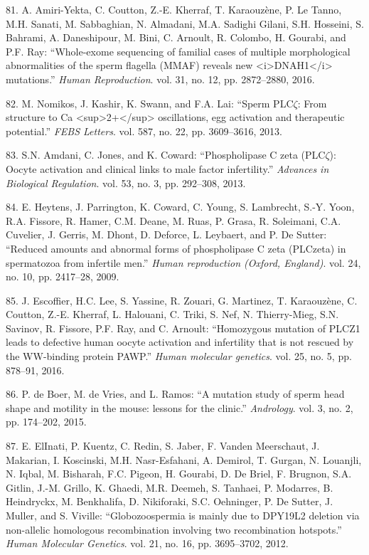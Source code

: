 \documentclass[12pt,twoside]{ugathesis}
\theoremstyle{definition}
\theoremstyle{definition}
\theoremstyle{remark}
\begin{document}
\hypertarget{ref-Amiri-Yekta2016}{}
81. A. Amiri-Yekta, C. Coutton, Z.-E. Kherraf, T. Karaouzène, P. Le
Tanno, M.H. Sanati, M. Sabbaghian, N. Almadani, M.A. Sadighi Gilani,
S.H. Hosseini, S. Bahrami, A. Daneshipour, M. Bini, C. Arnoult, R.
Colombo, H. Gourabi, and P.F. Ray: ``Whole-exome sequencing of familial
cases of multiple morphological abnormalities of the sperm flagella
(MMAF) reveals new
\textless{}i\textgreater{}DNAH1\textless{}/i\textgreater{} mutations.''
\emph{Human Reproduction}. vol. 31, no. 12, pp. 2872--2880, 2016.

\hypertarget{ref-Nomikos2013}{}
82. M. Nomikos, J. Kashir, K. Swann, and F.A. Lai: ``Sperm PLC\(\zeta\):
From structure to Ca
\textless{}sup\textgreater{}2+\textless{}/sup\textgreater{}
oscillations, egg activation and therapeutic potential.'' \emph{FEBS
Letters}. vol. 587, no. 22, pp. 3609--3616, 2013.

\hypertarget{ref-Amdani2013}{}
83. S.N. Amdani, C. Jones, and K. Coward: ``Phospholipase C zeta
(PLC\(\zeta\)): Oocyte activation and clinical links to male factor
infertility.'' \emph{Advances in Biological Regulation}. vol. 53, no. 3,
pp. 292--308, 2013.

\hypertarget{ref-Heytens2009}{}
84. E. Heytens, J. Parrington, K. Coward, C. Young, S. Lambrecht, S.-Y.
Yoon, R.A. Fissore, R. Hamer, C.M. Deane, M. Ruas, P. Grasa, R.
Soleimani, C.A. Cuvelier, J. Gerris, M. Dhont, D. Deforce, L. Leybaert,
and P. De Sutter: ``Reduced amounts and abnormal forms of phospholipase
C zeta (PLCzeta) in spermatozoa from infertile men.'' \emph{Human
reproduction (Oxford, England)}. vol. 24, no. 10, pp. 2417--28, 2009.

\hypertarget{ref-Escoffier2016}{}
85. J. Escoffier, H.C. Lee, S. Yassine, R. Zouari, G. Martinez, T.
Karaouzène, C. Coutton, Z.-E. Kherraf, L. Halouani, C. Triki, S. Nef, N.
Thierry-Mieg, S.N. Savinov, R. Fissore, P.F. Ray, and C. Arnoult:
``Homozygous mutation of PLCZ1 leads to defective human oocyte
activation and infertility that is not rescued by the WW-binding protein
PAWP.'' \emph{Human molecular genetics}. vol. 25, no. 5, pp. 878--91,
2016.

\hypertarget{ref-DeBoer2015}{}
86. P. de Boer, M. de Vries, and L. Ramos: ``A mutation study of sperm
head shape and motility in the mouse: lessons for the clinic.''
\emph{Andrology}. vol. 3, no. 2, pp. 174--202, 2015.

\hypertarget{ref-ElInati2012}{}
87. E. ElInati, P. Kuentz, C. Redin, S. Jaber, F. Vanden Meerschaut, J.
Makarian, I. Koscinski, M.H. Nasr-Esfahani, A. Demirol, T. Gurgan, N.
Louanjli, N. Iqbal, M. Bisharah, F.C. Pigeon, H. Gourabi, D. De Briel,
F. Brugnon, S.A. Gitlin, J.-M. Grillo, K. Ghaedi, M.R. Deemeh, S.
Tanhaei, P. Modarres, B. Heindryckx, M. Benkhalifa, D. Nikiforaki, S.C.
Oehninger, P. De Sutter, J. Muller, and S. Viville: ``Globozoospermia is
mainly due to DPY19L2 deletion via non-allelic homologous recombination
involving two recombination hotspots.'' \emph{Human Molecular Genetics}.
vol. 21, no. 16, pp. 3695--3702, 2012.
\end{document}
